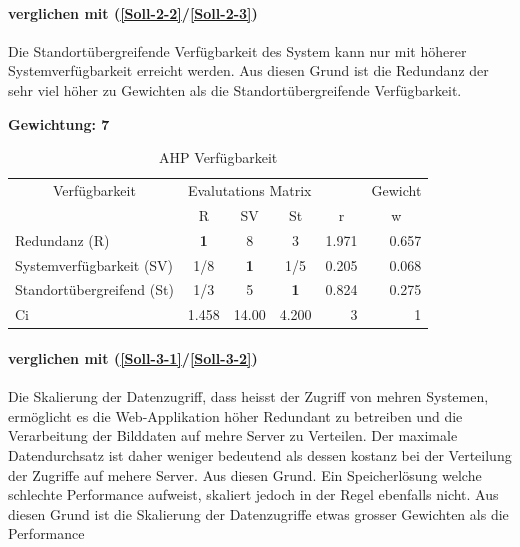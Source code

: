 \paragraph*{ verglichen mit  (\ref{Soll-2-2}/\ref{Soll-2-3})}
Die Standortübergreifende Verfügbarkeit des System kann nur mit höherer Systemverfügbarkeit erreicht werden. Aus diesen Grund ist die Redundanz der sehr viel höher zu Gewichten als die Standortübergreifende Verfügbarkeit.

\textbf{Gewichtung: 7}

\begin{table}[htbp]
\caption{AHP Verfügbarkeit}
\begin{tabular}{|p{7.1cm}|c|c|c|r|r|}
\hline
\multicolumn{ 1}{|c|}{Verfügbarkeit} & \multicolumn{ 3}{c|}{Evalutations Matrix} & \multicolumn{1}{l|}{} & \multicolumn{1}{l|}{Gewicht} \\ \cline{ 2- 6}
\multicolumn{ 1}{|c|}{} & R & SV & St & \multicolumn{1}{c|}{r} & \multicolumn{1}{c|}{w} \\ \hline
Redundanz (R) & \textbf{1    } & 8     & 3     & 1.971 & 0.657 \\ \hline
Systemverfügbarkeit (SV) &  1/8 & \textbf{1} &  1/5 & 0.205 & 0.068 \\ \hline
Standortübergreifend (St) &  1/3 & 5     & \textbf{1} & 0.824 & 0.275 \\ \hline \hline
Ci & \multicolumn{1}{r|}{1.458} & \multicolumn{1}{r|}{14.00} & \multicolumn{1}{r|}{4.200} & 3 & 1 \\ \hline
\end{tabular}
\label{AHPVerfügbarkeit}
\end{table}

\paragraph*{ verglichen mit  (\ref{Soll-3-1}/\ref{Soll-3-2})}
Die Skalierung der Datenzugriff, dass heisst der Zugriff von mehren Systemen, ermöglicht es die Web-Applikation höher Redundant zu betreiben und die Verarbeitung der Bilddaten auf mehre Server zu Verteilen. Der maximale Datendurchsatz ist daher weniger bedeutend als dessen kostanz bei der Verteilung der Zugriffe auf mehere Server. Aus diesen Grund. Ein Speicherlösung welche schlechte Performance aufweist, skaliert jedoch in der Regel ebenfalls nicht. Aus diesen Grund ist die Skalierung der Datenzugriffe etwas grosser Gewichten als die Performance 

